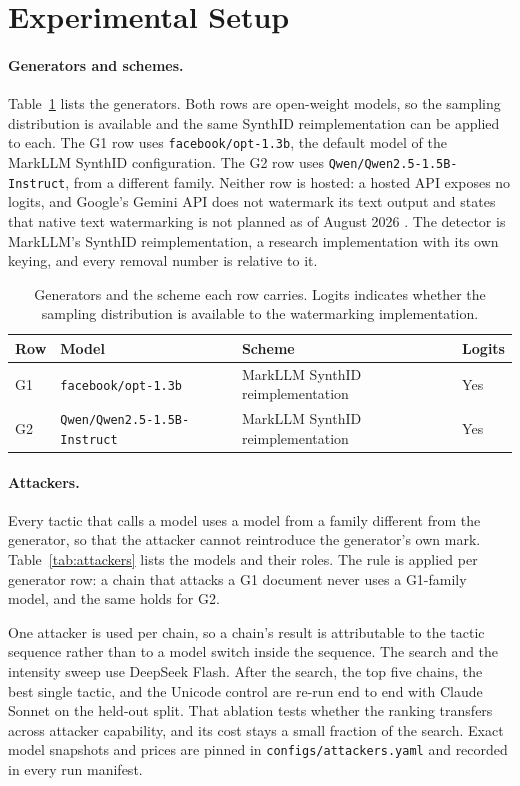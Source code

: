 \section{Experimental Setup}
\label{sec:setup}

\paragraph{Generators and schemes.}
Table~\ref{tab:generators} lists the generators. Both rows are open-weight models, so the sampling distribution is available and the same SynthID reimplementation can be applied to each. The G1 row uses \texttt{facebook/opt-1.3b}, the default model of the MarkLLM SynthID configuration. The G2 row uses \texttt{Qwen/Qwen2.5-1.5B-Instruct}, from a different family. Neither row is hosted: a hosted API exposes no logits, and Google's Gemini API does not watermark its text output and states that native text watermarking is not planned as of August 2026 \citep{googleforum}. The detector is MarkLLM's SynthID reimplementation, a research implementation with its own keying, and every removal number is relative to it.

\begin{table}[t]
\centering
\small
\caption{Generators and the scheme each row carries. Logits indicates whether the sampling distribution is available to the watermarking implementation.}
\label{tab:generators}
\begin{tabular}{@{}llll@{}}
\toprule
Row & Model & Scheme & Logits \\
\midrule
G1 & \texttt{facebook/opt-1.3b} & MarkLLM SynthID reimplementation & Yes \\
G2 & \texttt{Qwen/Qwen2.5-1.5B-Instruct} & MarkLLM SynthID reimplementation & Yes \\
\bottomrule
\end{tabular}
\end{table}

\paragraph{Attackers.}
Every tactic that calls a model uses a model from a family different from the generator, so that the attacker cannot reintroduce the generator's own mark. Table~\ref{tab:attackers} lists the models and their roles. The rule is applied per generator row: a chain that attacks a G1 document never uses a G1-family model, and the same holds for G2.

One attacker is used per chain, so a chain's result is attributable to the tactic sequence rather than to a model switch inside the sequence. The search and the intensity sweep use DeepSeek Flash. After the search, the top five chains, the best single tactic, and the Unicode control are re-run end to end with Claude Sonnet on the held-out split. That ablation tests whether the ranking transfers across attacker capability, and its cost stays a small fraction of the search. Exact model snapshots and prices are pinned in \texttt{configs/attackers.yaml} and recorded in every run manifest.

